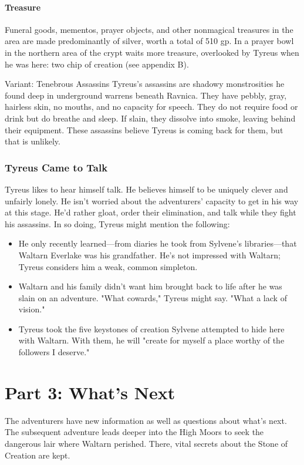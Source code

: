 \documentclass[10pt,a4paper,twoside,twocolumn,openany,bg=print,nodeprecatedcode]{dndbook}
\begin{document}
\subsubsection{Treasure}
Funeral goods, mementos, prayer objects, and other nonmagical treasures in the area are made predominantly of silver, worth a total of 510 gp. In a prayer bowl in the northern area of the crypt waits more treasure, overlooked by Tyreus when he was here: two chip of creation (see appendix B).
\begin{DndComment}{Variant: Tenebrous Assassins}
Tyreus's assassins are shadowy monstrosities he found deep in underground warrens beneath Ravnica. They have pebbly, gray, hairless skin, no mouths, and no capacity for speech. They do not require food or drink but do breathe and sleep. If slain, they dissolve into smoke, leaving behind their equipment.
These assassins believe Tyreus is coming back for them, but that is unlikely.
\end{DndComment}

\subsection{Tyreus Came to Talk}
Tyreus likes to hear himself talk. He believes himself to be uniquely clever and unfairly lonely. He isn't worried about the adventurers' capacity to get in his way at this stage. He'd rather gloat, order their elimination, and talk while they fight his assassins.
In so doing, Tyreus might mention the following:

\begin{itemize}
\item He only recently learned—from diaries he took from Sylvene's libraries—that Waltarn Everlake was his grandfather. He's not impressed with Waltarn; Tyreus considers him a weak, common simpleton.
\item Waltarn and his family didn't want him brought back to life after he was slain on an adventure. "What cowards," Tyreus might say. "What a lack of vision."
\item Tyreus took the five keystones of creation Sylvene attempted to hide here with Waltarn. With them, he will "create for myself a place worthy of the followers I deserve."
\end{itemize}

\chapter{Part 3: What's Next}
The adventurers have new information as well as questions about what's next. The subsequent adventure leads deeper into the High Moors to seek the dangerous lair where Waltarn perished. There, vital secrets about the Stone of Creation are kept.
\appendix
\end{document}
